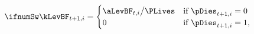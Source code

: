 \begin{equation*} \ifnumSw
\kLevBF_{t+1,i}  =
\begin{cases}
    \aLevBF_{t,i} \big/\PLives & \text{if } \pDies_{t+1,i} = 0 \\
     0                       & \text{if } \pDies_{t+1,i} = 1,
\end{cases} \label{eq:tontine}
\end{equation*}
